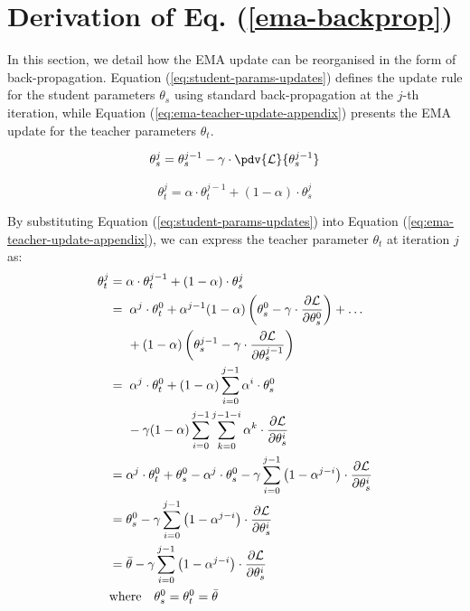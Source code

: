 \section{Derivation of Eq. (\ref{ema-backprop})}
\label{sec:eq-5-derivation}
In this section, we detail how the EMA update can be reorganised in the form of back-propagation. Equation (\ref{eq:student-params-updates}) defines the update rule for the student parameters $\theta_s$ using standard back-propagation at the $j$-th iteration, while Equation (\ref{eq:ema-teacher-update-appendix}) presents the EMA update for the teacher parameters $\theta_t$.

\begin{equation}
    \label{eq:student-params-updates}
    \theta_s^j = \theta_s^{j-1} - \gamma \cdot \pdv{\mathcal{L}}{\theta_s^{j-1}}
\end{equation}

\begin{equation}
    \label{eq:ema-teacher-update-appendix}
    \theta_t^j = \alpha \cdot \theta_t^{j-1} + (1-\alpha) \cdot \theta_s^j
\end{equation}

By substituting Equation (\ref{eq:student-params-updates}) into Equation (\ref{eq:ema-teacher-update-appendix}), we can express the teacher parameter $\theta_t$ at iteration $j$ as:
{
\footnotesize
\begin{align}
\theta^j_t &= \alpha \cdot \theta^{j-1}_t + (1-\alpha) \cdot \theta^{j}_s \nonumber\\
&= \hspace{1mm} \alpha^{j} \cdot \theta^{0}_t + \alpha^{j-1}(1-\alpha)\left(\theta^{0}_s - \gamma \cdot  \frac{\partial \mathcal{L}}{\partial \theta^{0}_s}\right) + \dots \\ 
& \hspace{5mm} + (1-\alpha)\left(\theta^{j-1}_s - \gamma \cdot \frac{\partial \mathcal{L}}{\partial \theta^{j-1}_s}\right) \nonumber \\
&= \hspace{1mm} \alpha^{j} \cdot \theta^{0}_t + (1-\alpha) \sum_{i=0}^{j-1}\alpha^{i} \cdot \theta^{0}_s  \\
& \hspace{5mm} - \gamma(1-\alpha) \sum_{i=0}^{j-1}\sum_{k=0}^{j-1-i} \alpha^{k} \cdot \frac{\partial \mathcal{L}}{\partial \theta_s^i} \nonumber\\
&= \alpha^j \cdot \theta^0_t + \theta^0_s - \alpha^j \cdot \theta^0_s - \gamma \sum_{i=0}^{j-1}\left(1 - \alpha^{j-i}\right) \cdot \frac{\partial \mathcal{L}}{\partial \theta_s^i} \nonumber\\
&= \theta^0_s - \gamma \sum_{i=0}^{j-1}\left(1 - \alpha^{j-i}\right) \cdot \frac{\partial \mathcal{L}}{\partial \theta_s^i} \nonumber\\
&= \bar{\theta} - \gamma \sum_{i=0}^{j-1}\left(1 - \alpha^{j-i}\right) \cdot \frac{\partial \mathcal{L}}{\partial \theta_s^i} \nonumber\\
&\text{where} \quad \theta^0_s = \theta^0_t = \bar{\theta}
\end{align}
}

